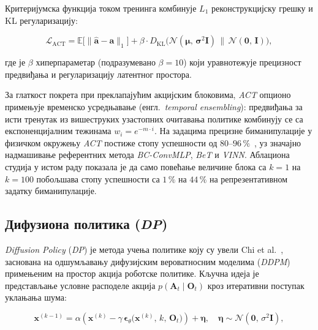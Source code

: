 \documentclass[12pt, a4paper]{article}
\begin{document}
Критеријумска функција током тренинга комбинује $L_1$ реконструкцијску грешку и KL регуларизацију:

\begin{equation}
    \mathcal{L}_{\mathrm{ACT}}
    = \mathbb{E}\bigl[\|\hat{\mathbf{a}} - \mathbf{a}\|_1\bigr]
    + \beta \cdot D_{\mathrm{KL}}\!\bigl(\mathcal{N}(\boldsymbol{\mu},\,\boldsymbol{\sigma}^2\mathbf{I})\,\|\,\mathcal{N}(\mathbf{0},\,\mathbf{I})\bigr),
    \label{eq:act_loss}
\end{equation}

\noindent где је $\beta$ хиперпараметар (подразумевано $\beta = 10$) који уравнотежује прецизност предвиђања и регуларизацију латентног простора.

За глаткост покрета при преклапајућим акцијским блоковима, \textit{ACT} опционо примењује временско усредњавање (енгл.\ \textit{temporal ensembling}): предвиђања за исти тренутак из вишеструких узастопних очитавања политике комбинују се са експоненцијалним тежинама $w_i = e^{-m\cdot i}$.
На задацима прецизне биманипулације у физичком окружењу \textit{ACT} постиже стопу успешности од $80$–$96\,\%$~\cite{zhao2023act}, уз значајно надмашивање референтних метода \textit{BC-ConvMLP}, \textit{BeT} и \textit{VINN}.
Аблациона студија у истом раду показала је да само повећање величине блока са $k{=}1$ на $k{=}100$ побољшава стопу успешности са $1\,\%$ на $44\,\%$ на репрезентативном задатку биманипулације.

\subsection{Дифузиона политика (\textit{DP})}
\label{subsec:dp}

\textit{Diffusion Policy} (\textit{DP}) је метода учења политике коју су увели Chi et al.~\cite{chi2023diffusionpolicy}, заснована на одшумљавању дифузијским вероватносним моделима (\textit{DDPM})~\cite{ho2020ddpm} примењеним на простор акција роботске политике.
Кључна идеја је представљање условне расподеле акција $p(\mathbf{A}_t \mid \mathbf{O}_t)$ кроз итеративни поступак уклањања шума:

\begin{equation}
    \mathbf{x}^{(k-1)} = \alpha\!\left(\mathbf{x}^{(k)} - \gamma\,\boldsymbol{\epsilon}_\theta\!\bigl(\mathbf{x}^{(k)},\,k,\,\mathbf{O}_t\bigr)\right) + \boldsymbol{\eta}, \quad \boldsymbol{\eta} \sim \mathcal{N}(\mathbf{0},\,\sigma^2\mathbf{I}),
    \label{eq:dp_denoising}
\end{equation}
\end{document}
